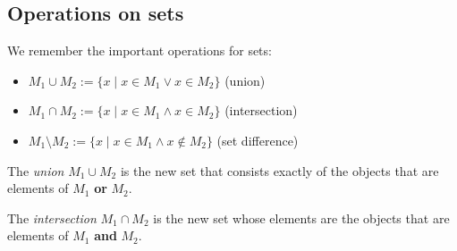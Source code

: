 
\subsection*{Operations on sets}

We remember the important operations for sets:

\begin{itemize}
 \item $M_1 \cup M_2 := \{ x \mid x\in M_1 \vee x \in M_2 \}$ (union)
 \item $M_1 \cap M_2 := \{ x \mid x \in M_1 \wedge x \in M_2\}$ (intersection)
 \item $M_1 \setminus M_2 := \{ x \mid x \in M_1 \wedge x \not\in M_2 \}$ (set difference)
\end{itemize}

\begin{Definition}
   The \emph{union} $M_1\cup M_2$ 
   is the new set that consists exactly
   of the objects that are elements of $M_1$ \textbf{or} $M_2$.
  
  The \emph{intersection} $M_1\cap M_2$ 
  is the new set
  whose elements 
  are the objects that are elements of $M_1$ \textbf{and} $M_2$.


\end{Definition}
